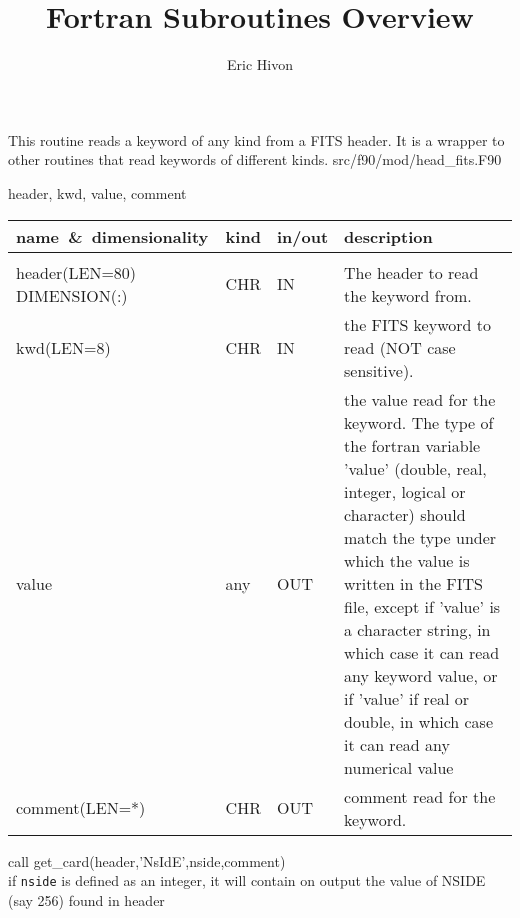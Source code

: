 
\sloppy

\title{\healpix Fortran Subroutines Overview}
 \section[get\_card]{ }
\label{sub:get_card}
\author{Eric Hivon}

\begin{facility}
{This routine reads a keyword of any kind from a FITS header. It is a wrapper to
other routines that read keywords of different kinds.}
{src/f90/mod/head\_fits.F90}
\end{facility}

\begin{f90format}
{header, kwd, value, comment}
\end{f90format}

\begin{arguments}
{
\begin{tabular}{p{0.4\hsize} p{0.05\hsize} p{0.1\hsize} p{0.35\hsize}} \hline  
\textbf{name~\&~dimensionality} & \textbf{kind} & \textbf{in/out} & \textbf{description} \\ \hline
                   &   &   &                           \\ %
header(LEN=80) DIMENSION(:) & CHR & IN & The header to read the keyword from. \\
kwd(LEN=8) & CHR & IN & the FITS keyword to read (NOT case sensitive). \\
value & any & OUT & the value read for the keyword. 
The type of the fortran variable 'value' (double, real, integer, logical or
                   character) should match the type under which the
                   value is written in the FITS file, except if
                   'value' is a character string, in which case it can read any
                   keyword value, or if 'value' if real or double, in which case
                   it can read any numerical value\\
comment(LEN=*) & CHR & OUT & comment read for the keyword. \\ 
\end{tabular}
}
\end{arguments}

\begin{example}
{
call get\_card(header,'NsIdE',nside,comment)  \\
}
{
if {\tt nside} is defined as an integer, it
will contain on output the value of NSIDE (say 256) found in header
}
\end{example}

